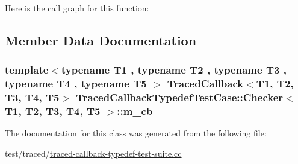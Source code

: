 Here is the call graph for this function\+:




\subsection{Member Data Documentation}
\subsubsection[{\texorpdfstring{m\+\_\+cb}{m_cb}}]{\setlength{\rightskip}{0pt plus 5cm}template$<$typename T1 , typename T2 , typename T3 , typename T4 , typename T5 $>$ {\bf Traced\+Callback}$<$T1, T2, T3, T4, T5$>$ {\bf Traced\+Callback\+Typedef\+Test\+Case\+::\+Checker}$<$ T1, T2, T3, T4, T5 $>$\+::m\+\_\+cb\hspace{0.3cm}{\ttfamily [private]}}\hypertarget{classTracedCallbackTypedefTestCase_1_1Checker_a5c76802d9ac80fcfcc60c0238cc5f7cc}{}\label{classTracedCallbackTypedefTestCase_1_1Checker_a5c76802d9ac80fcfcc60c0238cc5f7cc}


The documentation for this class was generated from the following file\+:\begin{DoxyCompactItemize}
\item 
test/traced/\hyperlink{traced-callback-typedef-test-suite_8cc}{traced-\/callback-\/typedef-\/test-\/suite.\+cc}\end{DoxyCompactItemize}

